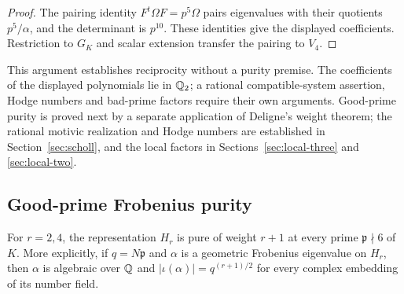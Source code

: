 \begin{proof}
The pairing identity $F^t\Omega F=p^5\Omega$ pairs eigenvalues with
their quotients $p^5/\alpha$, and the determinant is $p^{10}$.
These identities give the displayed coefficients. Restriction to
$G_K$ and scalar extension transfer the pairing to $V_4$.
\end{proof}

\begin{remark}
This argument establishes reciprocity without a purity premise. The
coefficients of the displayed polynomials lie in $\mathbb Q_2$; a rational
compatible-system assertion, Hodge numbers and bad-prime factors
require their own arguments. Good-prime purity is proved next by a
separate application of Deligne's weight theorem; the rational motivic
realization and Hodge numbers are established in Section~\ref{sec:scholl},
and the local factors in Sections~\ref{sec:local-three} and \ref{sec:local-two}.
\end{remark}

\subsection{Good-prime Frobenius purity}

\begin{proposition}\label{prop:good-prime-purity}
For $r=2,4$, the representation $H_r$ is pure of weight $r+1$ at
every prime $\mathfrak p\nmid6$ of $K$. More explicitly, if
$q=N\mathfrak p$ and $\alpha$ is a geometric Frobenius eigenvalue
on $H_r$, then $\alpha$ is algebraic over $\mathbb Q$ and
$|\iota(\alpha)|=q^{(r+1)/2}$ for every complex embedding of its
number field.
\end{proposition}

